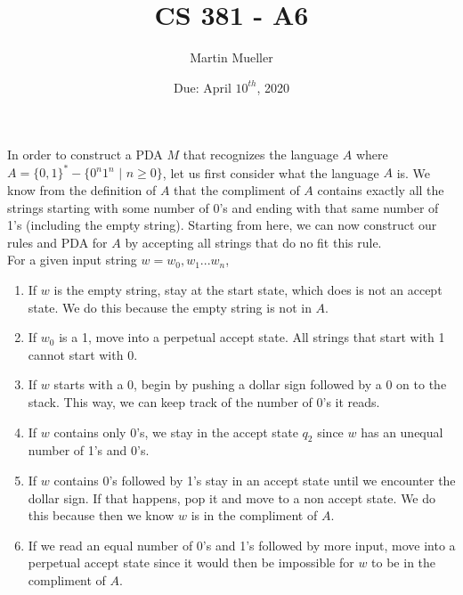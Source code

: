 \documentclass{article}
\title{CS 381 - A6}
\author{Martin Mueller}
\date{Due: April $10^{th}$, 2020}
\begin{document}
    \maketitle
    In order to construct a PDA $M$ that recognizes the language $A$ where $A = \{0, 1\}^{*} - \{0^{n}1^{n}$ $|$ $n \ge 0\}$, let us first consider what the language $A$ is. We know from the definition of $A$ that the compliment of $A$ contains exactly all the strings starting with some number of 0's and ending with that same number of 1's (including the empty string). Starting from here, we can now construct our rules and PDA for $A$ by accepting all strings that do no fit this rule. \\
    For a given input string $w = w_{0}, w_{1}...w_{n}$,
    \begin{enumerate}
        \item If $w$ is the empty string, stay at the start state, which does is not an accept state. We do this because the empty string is not in $A$.
        \item If $w_{0}$ is a 1, move into a perpetual accept state. All strings that start with 1 cannot start with 0.
        \item If $w$ starts with a 0, begin by pushing a dollar sign followed by a 0 on to the stack. This way, we can keep track of the number of 0's it reads.
        \item If $w$ contains only 0's, we stay in the accept state $q_{2}$ since $w$ has an unequal number of 1's and 0's.
        \item If $w$ contains 0's followed by 1's stay in an accept state until we encounter the dollar sign. If that happens, pop it and move to a non accept state. We do this because then we know $w$ is in the compliment of $A$.
        \item If we read an equal number of 0's and 1's followed by more input, move into a perpetual accept state since it would then be impossible for $w$ to be in the compliment of $A$.
    \end{enumerate}
\end{document}
